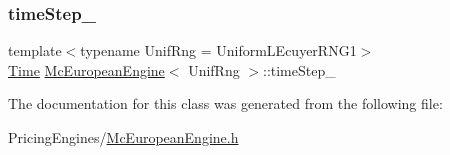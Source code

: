 \subsubsection{\texorpdfstring{time\+Step\+\_\+}{timeStep\_}}
{\footnotesize\ttfamily template$<$typename Unif\+Rng  = Uniform\+L\+Ecuyer\+R\+N\+G1$>$ \\
\hyperlink{_name_def_8h_ac2d3e0ba793497bcca555c7c2cf64ff3}{Time} \hyperlink{class_mc_european_engine}{Mc\+European\+Engine}$<$ Unif\+Rng $>$\+::time\+Step\+\_\+\hspace{0.3cm}{\ttfamily [private]}}



The documentation for this class was generated from the following file\+:\begin{DoxyCompactItemize}
\item 
Pricing\+Engines/\hyperlink{_mc_european_engine_8h}{Mc\+European\+Engine.\+h}\end{DoxyCompactItemize}
